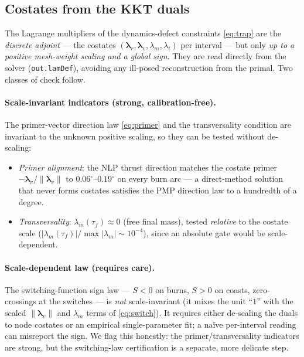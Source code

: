 \documentclass[11pt]{article}
\newcommand{\code}[1]{\texttt{\small #1}}
\begin{document}
\subsection{Costates from the KKT duals}
The Lagrange multipliers of the dynamics-defect constraints \eqref{eq:trap} are
the \emph{discrete adjoint} --- the costates $(\boldsymbol\lambda_r,
\boldsymbol\lambda_v,\lambda_m,\lambda_t)$ per interval --- but only \emph{up to
a positive mesh-weight scaling and a global sign}. They are read directly from
the solver (\code{out.lamDef}), avoiding any ill-posed reconstruction from the
primal. Two classes of check follow.

\paragraph{Scale-invariant indicators (strong, calibration-free).} The
primer-vector direction law \eqref{eq:primer} and the transversality condition
are invariant to the unknown positive scaling, so they can be tested without
de-scaling:
\begin{itemize}
  \item \emph{Primer alignment}: the NLP thrust direction matches the costate
        primer $-\boldsymbol\lambda_v/\lVert\boldsymbol\lambda_v\rVert$ to
        $0.06^\circ$--$0.19^\circ$ on every burn arc --- a direct-method solution
        that never forms costates satisfies the PMP direction law to a hundredth
        of a degree.
  \item \emph{Transversality}: $\lambda_m(\tau_f)\approx0$ (free final mass),
        tested \emph{relative} to the costate scale
        ($|\lambda_m(\tau_f)|/\max|\lambda_m|\sim10^{-4}$), since an absolute
        gate would be scale-dependent.
\end{itemize}

\paragraph{Scale-dependent law (requires care).} The switching-function sign law
--- $S<0$ on burns, $S>0$ on coasts, zero-crossings at the switches --- is
\emph{not} scale-invariant (it mixes the unit ``$1$'' with the scaled
$\lVert\boldsymbol\lambda_v\rVert$ and $\lambda_m$ terms of
\eqref{eq:switch}). It requires either de-scaling the duals to node costates or
an empirical single-parameter fit; a na\"ive per-interval reading can misreport
the sign. We flag this honestly: the primer/transversality indicators are
strong, but the switching-law certification is a separate, more delicate step.
\end{document}
